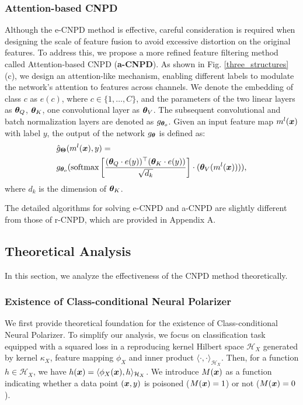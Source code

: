 \subsubsection{Attention-based CNPD\label{sec3.4.3}}
Although the e-CNPD method is effective, careful consideration is required when designing the scale of feature fusion to avoid excessive distortion on the original features. To address this, we propose a more refined feature filtering method called Attention-based CNPD (\textbf{a-CNPD}). As shown in Fig. \ref{three_structures} (c), we design an attention-like \cite{vaswani2017attention} mechanism, enabling different labels to modulate the network's attention to features across channels. 
We denote the embedding of class \(c\) as \(e(c)\), where \(c \in \{1, \dots, C\}\), and the parameters of the two linear layers as \(\bm{\theta}_Q\), \(\bm{\theta}_K\), one convolutional layer as \(\bm{\theta}_V\). The subsequent convolutional and batch normalization layers are denoted as \(g_{\bm{\theta}_o}\). Given an input feature map \(m^l(\bm{x})\) with label \(y\), the output of the network \(g_{\bm{\theta}}\) is defined as:
\begin{equation}
\label{eq:anpd}
    \begin{aligned}
    	&\hat{g}_{\bm{\Theta}}(m^l(\bm{x}), y) = \\
    	&g_{\bm{\theta}_o}(\text{softmax}\left[\frac{(\bm{\theta}_Q \cdot e(y))^{\top} (\bm{\theta}_K \cdot e(y))}{\sqrt{d_k}}\right]\cdot (\bm{\theta}_V (m^l(\bm{x})))),
    \end{aligned}
\end{equation}
where \(d_k\) is the dimension of \(\bm{\theta}_K\).

The detailed algorithms for solving e-CNPD and a-CNPD are slightly different from those of r-CNPD, which are provided in Appendix A.


\subsection{Theoretical Analysis\label{sec3.6}}
In this section, we analyze the effectiveness of the CNPD method theoretically. 

\subsubsection{Existence of Class-conditional Neural Polarizer}
We first provide theoretical foundation for the existence of Class-conditional Neural Polarizer. To simplify our analysis, we focus on classification task equipped with a squared loss \cite{masnadi2008design} in a reproducing kernel Hilbert space $\mathcal{H}_{X}$ \cite{rosipal2001kernel} generated by kernel $\kappa_{X}$, feature mapping $\phi_{X}$ and inner product $\langle \cdot, \cdot\rangle_{\mathcal{H}_{X}}$. Then, for a function $h\in \mathcal{H}_{X}$, we have $h(\bm{x})=\langle \phi_{X}(\bm{x}),h\rangle_{\mathcal{H}_{X}}$. 
We introduce $M(\bm{x})$ as a function indicating whether a data point $(\bm{x},y)$ is poisoned ($M(\bm{x})=1$) or not ($M(\bm{x})=0$). 

